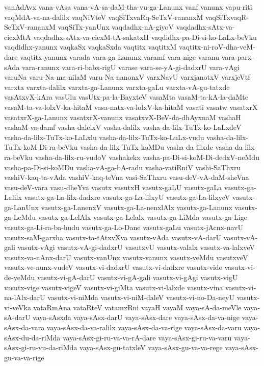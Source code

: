{vanAdAvx
vana-vAsa
vana-vA-sa-daM-tha-vu-ga-Lanunx
vanf
vanunx
vapu-riti
vaqMdA-va-na-dalilx
vaqNiVteV
vaqSiTxvaRq-SeTxV-rananxM
vaqSiTxvaqR-SeTxV-rananxM
vaqSiTx-yanUnx
vaqdadhx-nA-giyoV
vaqdadhx-sAtx-va-cicxMtA
vaqdadhx-sAtx-va-cicxM-tA-sakatxH
vaqdidhx-pa-Di-si-ko-LaLx-beVku
vaqdidhx-yanunx
vaqkaSx
vaqkaSxda
vaqtitx
vaqtitxM
vaqtitx-ni-roV-dha-veM-dare
vaqtitx-yanunx
varada
vara-ga-Lanunx
varamf
vara-nige
varanu
vara-parx-sAda
vara-ranunx
vara-ri-babx-rigU
varase
vara-se-yA-gi-dadxrU
vara-vAgi
varuNa
varu-Na-ma-nilaM
varu-Na-nanonxV
varxNavU
varxjanotxV
varxjeVtf
varxta
varxta-dalilx
varxta-ga-Lanunx
varxta-gaLu
varxta-vA-gu-tatxde
vasAtxvX-kAra
vasUlu
vasUtx-pa-la-BayxteV
vasaMta
vasaM-ta-kA-la-daMte
vasaM-ta-va-lolxV-ka-hitaM
vasa-natx-va-lolxV-ka-hitaM
vasati
vasatw
vasatxrX
vasatxrX-ga-Lanunx
vasatxrX-vanunx
vasatxvX-BeV-da-dhAyxnaM
vashaH
vashaM-va-damf
vasha-dalelxV
vasha-dalilx
vasha-da-lilx-TuTx-ko-LaLxdeV
vasha-da-lilx-TuTx-ko-LaLxlu
vasha-da-lilx-TuTx-ko-LuLx-vudu
vasha-da-lilx-TuTx-koM-Di-ra-beVku
vasha-da-lilx-TuTx-koMDu
vasha-da-lilxde
vasha-da-lilx-ra-beVku
vasha-da-lilx-ru-vudoV
vashakekx
vasha-pa-Di-si-koM-Di-dedxV-neMdu
vasha-pa-Di-si-koMDu
vasha-vA-ga-bA-radu
vasha-vatiRniV
vashi-SaThxru
vashiV-kaq-ta-vAda
vashiV-kaq-teVna
vasi-SaThxru
vasu-deV-vA-daM-sheVna
vasu-deV-vara
vasu-dheYva
vasutx
vasutxH
vasutx-gaLU
vasutx-gaLa
vasutx-ga-Lalilx
vasutx-ga-La-lilx-dadxre
vasutx-ga-La-lilxyU
vasutx-ga-La-lilxyeV
vasutx-ga-LanUnx
vasutx-ga-LanenxV
vasutx-ga-La-nenxlAlx
vasutx-ga-Lanunx
vasutx-ga-LeMdu
vasutx-ga-LelAlx
vasutx-ga-Lelalx
vasutx-ga-LiMda
vasutx-ga-Lige
vasutx-ga-Li-ra-ba-hudu
vasutx-ga-Lo-Dane
vasutx-gaLu
vasutx-jAcnx-navU
vasutx-saM-garxha
vasutx-ta-tAtxvXva
vasutx-vAda
vasutx-vA-darU
vasutx-vA-gali
vasutx-vAgi
vasutx-vA-gi-dadxrU
vasutxvU
vasutx-valalx
vasutx-va-lalxveV
vasutx-va-nAnx-darU
vasutx-vanUnx
vasutx-vanunx
vasutx-veMdu
vasutxveV
vasutx-ve-nunx-vudeV
vasutx-vi-dadxrU
vasutx-vi-dadxre
vasutx-vide
vasutx-vi-de-yeMdu
vasutx-vi-gA-darU
vasutx-vi-gA-gali
vasutx-vi-gAgi
vasutx-vigU
vasutx-vige
vasutx-vigeV
vasutx-vi-giMta
vasutx-vi-lalxde
vasutx-vina
vasutx-vi-na-lAlx-darU
vasutx-vi-niMda
vasutx-vi-niM-daleV
vasutx-vi-no-Da-neyU
vasutx-vi-veVka
vataRmAna
vataRteV
vatamxRni
vayaH
vayaM
vaya-sA-da-meVle
vaya-sA-darU
vaya-sAsxda
vaya-sAsx-darU
vaya-sAsx-dare
vaya-sAsx-da-va-nige
vaya-sAsx-da-vara
vaya-sAsx-da-va-ralilx
vaya-sAsx-da-va-rige
vaya-sAsx-da-varu
vaya-sAsx-du-da-riMda
vaya-sAsx-gi-ru-va-va-rA-dare
vaya-sAsx-gi-ru-va-varu
vaya-sAsx-gi-ru-vu-da-riMda
vaya-sAsx-gu-tatxleV
vaya-sAsx-gu-va-va-rege
vaya-sAsx-gu-va-va-rige
}

